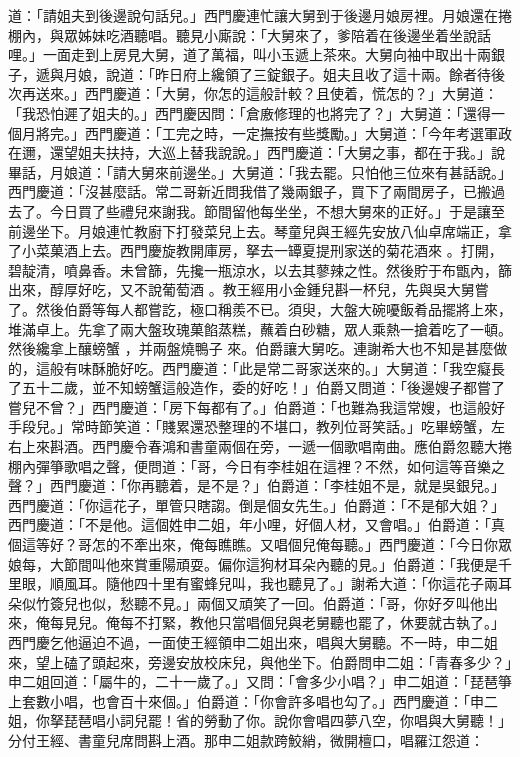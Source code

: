 \begin{showcontents}{}
道：「請姐夫到後邊說句話兒。」西門慶連忙讓大舅到于後邊月娘房裡。月娘還在捲棚內，與眾姊妹吃酒聽唱。聽見小廝說：「大舅來了，爹陪着在後邊坐着坐說話哩。」一面走到上房見大舅，道了萬福，叫小玉遞上茶來。大舅向袖中取出十兩銀子，遞與月娘，說道：「昨日府上纔領了三錠銀子。姐夫且收了這十兩。餘者待後次再送來。」西門慶道：「大舅，你怎的這般計較？且使着，慌怎的？」大舅道：「我恐怕遲了姐夫的。」西門慶因問：「倉廒修理的也將完了？」大舅道：「還得一個月將完。」西門慶道：「工完之時，一定撫按有些獎勵。」大舅道：「今年考選軍政在邇，還望姐夫扶持，大巡上替我說說。」西門慶道：「大舅之事，都在于我。」說畢話，月娘道：「請大舅來前邊坐。」大舅道：「我去罷。只怕他三位來有甚話說。」西門慶道：「沒甚麼話。常二哥新近問我借了幾兩銀子，買下了兩間房子，已搬過去了。今日買了些禮兒來謝我。節間留他每坐坐，不想大舅來的正好。」于是讓至前邊坐下。月娘連忙教廚下打發菜兒上去。琴童兒與王經先安放八仙卓席端正，拿了小菜菓酒上去。西門慶旋教開庫房，拏去一罈夏提刑家送的菊花酒來 。打開，碧靛清，噴鼻香。未曾篩，先攙一瓶涼水，以去其蓼辣之性。然後貯于布甑內，篩出來，醇厚好吃，又不說葡萄酒 。教王經用小金鍾兒斟一杯兒，先與吳大舅嘗了。然後伯爵等每人都嘗訖，極口稱羨不已。須臾，大盤大碗嚘飯肴品擺將上來，堆滿卓上。先拿了兩大盤玫瑰菓餡蒸糕，蘸着白砂糖，眾人乘熱一搶着吃了一頓。然後纔拿上釀螃蟹 ，并兩盤燒鴨子 來。伯爵讓大舅吃。連謝希大也不知是甚麼做的，這般有味酥脆好吃。西門慶道：「此是常二哥家送來的。」大舅道：「我空癡長了五十二歲，並不知螃蟹這般造作，委的好吃！」伯爵又問道：「後邊嫂子都嘗了嘗兒不曾？」西門慶道：「房下每都有了。」伯爵道：「也難為我這常嫂，也這般好手段兒。」常時節笑道：「賤累還恐整理的不堪口，教列位哥笑話。」吃畢螃蟹，左右上來斟酒。西門慶令春鴻和書童兩個在旁，一遞一個歌唱南曲。應伯爵忽聽大捲棚內彈箏歌唱之聲，便問道：「哥，今日有李桂姐在這裡？不然，如何這等音樂之聲？」西門慶道：「你再聽着，是不是？」伯爵道：「李桂姐不是，就是吳銀兒。」西門慶道：「你這花子，單管只瞎謅。倒是個女先生。」伯爵道：「不是郁大姐？」西門慶道：「不是他。這個姓申二姐，年小哩，好個人材，又會唱。」伯爵道：「真個這等好？哥怎的不牽出來，俺每瞧瞧。又唱個兒俺每聽。」西門慶道：「今日你眾娘每，大節間叫他來賞重陽頑耍。偏你這狗材耳朵內聽的見。」伯爵道：「我便是千里眼，順風耳。隨他四十里有蜜蜂兒叫，我也聽見了。」謝希大道：「你這花子兩耳朵似竹簽兒也似，愁聽不見。」兩個又頑笑了一回。伯爵道：「哥，你好歹叫他出來，俺每見兒。俺每不打緊，教他只當唱個兒與老舅聽也罷了，休要就古執了。」西門慶乞他逼迫不過，一面使王經領申二姐出來，唱與大舅聽。不一時，申二姐來，望上磕了頭起來，旁邊安放校床兒，與他坐下。伯爵問申二姐：「青春多少？」申二姐回道：「屬牛的，二十一歲了。」又問：「會多少小唱？」申二姐道：「琵琶箏上套數小唱，也會百十來個。」伯爵道：「你會許多唱也勾了。」西門慶道：「申二姐，你拏琵琶唱小詞兒罷！省的勞動了你。說你會唱四夢八空，你唱與大舅聽！」分付王經、書童兒席問斟上酒。那申二姐款跨鮫綃，微開檀口，唱羅江怨道：


\end{showcontents}
